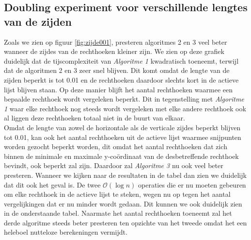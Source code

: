 \documentclass[11pt,a4paper,titlepage]{article}
\begin{document}
		\subsection{Doubling experiment voor verschillende lengtes van de zijden}
			Zoals we zien op figuur \ref{fig:zijde001}, presteren algoritmes 2 en 3 veel beter wanneer de zijdes van de rechthoeken kleiner zijn.  We zien op deze grafiek duidelijk dat de tijscomplexiteit van \emph{Algoritme 1} kwadratisch toeneemt, terwijl dat de algoritmen 2 en 3 zeer snel blijven. Dit komt omdat de lengte van de zijden beperkt is tot 0.01 en de rechthoeken daardoor slechts kort in de actieve lijst blijven staan.  Op deze manier blijft het aantal rechthoeken waarmee een bepaalde rechthoek wordt vergeleken beperkt. Dit in tegenstelling met \emph{Algoritme 1} waar elke rechthoek nog steeds wordt vergeleken met elke andere rechthoek ook al liggen deze rechthoeken totaal niet in de buurt van elkaar. \\
			Omdat de lengte van zowel de horizontale als de verticale zijdes beperkt blijven tot 0.01, kan ook het aantal rechthoeken uit de actieve lijst waarmee snijpunten worden gezocht beperkt worden, dit omdat het aantal rechthoeken dat zich binnen de minimale en maximale y-coördinaat van de desbetreffende rechthoek bevindt, ook beperkt zal zijn. Daardoor zal \emph{Algoritme 3} nu ook veel beter presteren. Wanneer we kijken naar de resultaten in de tabel dan zien we duidelijk dat dit ook het geval is. De twee $\mathcal{O}(\log n)$ operaties die er nu moeten gebeuren om elke rechthoek in de actieve lijst te steken, wegen nu op tegen het aantal vergelijkingen dat er nu minder wordt gedaan. Dit kunnen we ook duidelijk zien in de onderstaande tabel. Naarmate het aantal rechthoeken toeneemt zal het derde algoritme steeds beter presteren ten opzichte van het tweede omdat het een heleboel nutteloze berekeningen vermijdt.
\end{document}
